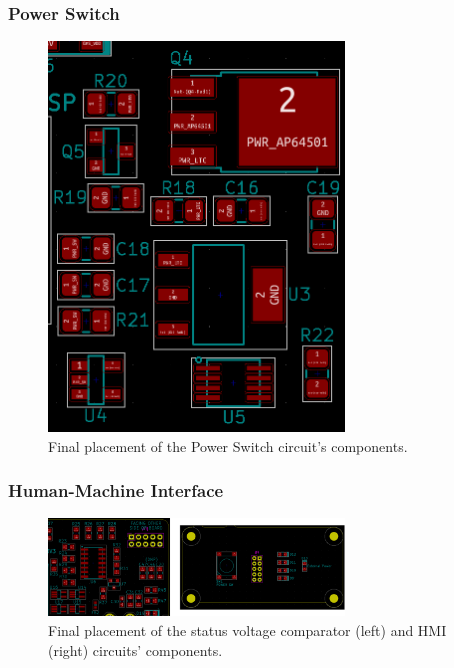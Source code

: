 \subsubsection{Power Switch}\label{sec:5115_PowerSwitch}


\begin{figure}[h]
	\centering
	\includegraphics[width=0.7\textwidth]{Chapters/Figures/chapter5/placement_PowerSwitch.png}
	\caption{Final placement of the Power Switch circuit's components.}
	\label{fig:placement_PowerSwitch}
\end{figure}%


\subsubsection{Human-Machine Interface}\label{sec:5116_HMI}

\begin{figure}[h]
	\centering
	\includegraphics[width=0.7\textwidth]{Chapters/Figures/chapter5/placement_HMI.png}
	\caption{Final placement of the status voltage comparator (left) and HMI (right) circuits' components.}
	\label{fig:placement_HMI}
\end{figure}%


